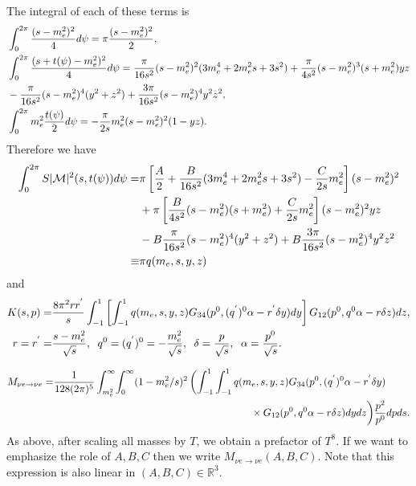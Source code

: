   The integral of each of these terms is
 \begin{align}
&\int_0^{2\pi}\frac{(s-m_e^2)^2}{4} d\psi=\pi\frac{(s-m_e^2)^2}{2},\\
&\int_0^{2\pi}\frac{(s+t(\psi)-m_e^2)^2}{4}d\psi=\frac{\pi}{16s^2}(s-m_e^2)^2(3m_e^4+2m_e^2s+3s^2)+\frac{\pi}{4s^2}(s-m_e^2)^3(s+m_e^2)yz\notag\\
&-\frac{\pi}{16s^2}(s-m_e^2)^4(y^2+z^2)+\frac{3\pi}{16s^2}(s-m_e^2)^4y^2z^2,\\
&\int_0^{2\pi} m_e^2\frac{t(\psi)}{2}d\psi=-\frac{\pi}{2s}m_e^2(s-m_e^2)^2(1-yz).
\end{align}
Therefore we have
\begin{align}
\int_0^{2\pi} S |\mathcal{M}|^2 (s,t(\psi))d\psi=&\pi\left[\frac{A}{2}+\frac{B}{16s^2}(3m_e^4+2m_e^2s+3s^2)-\frac{C}{2s}m_e^2\right](s-m_e^2)^2\notag\\
&+\pi\left[\frac{B}{4s^2}(s-m_e^2)(s+m_e^2)+\frac{C}{2s}m_e^2\right](s-m_e^2)^2yz\notag\\
&-B\frac{\pi}{16s^2}(s-m_e^2)^4(y^2+z^2)+B\frac{3\pi}{16s^2}(s-m_e^2)^4y^2z^2\notag\\
\equiv& \pi q(m_e,s,y,z)
\end{align}
and
\begin{align}\label{matrix_elem_int}
K(s,p)=&\frac{8\pi^2 rr^{'}}{s}\int_{-1}^1 \left[\int_{-1}^1 q(m_e,s,y,z) G_{34}(p^0,(q^{'})^0\alpha-r^{'}\delta y) dy\right] G_{12}(p^0,q^0\alpha-r\delta z)dz,\\
r=r^{'}=&\frac{s-m_e^2}{\sqrt{s}},\hspace{2mm} q^0=(q^{'})^0=-\frac{m_e^2}{\sqrt{s}},\hspace{2mm} \delta=\frac{p}{\sqrt{s}},\hspace{2mm}  \alpha=\frac{p^0}{\sqrt{s}}.
\end{align}

\begin{align}\label{M_simp}
M_{\nu e\rightarrow\nu e}=&\frac{1}{128(2\pi)^5 }\int_{m_e^2}^\infty\!\int_0^\infty (1-m_e^2/s)^2\left(\int_{-1}^1 \int_{-1}^1 q(m_e,s,y,z) G_{34}(p^0,(q^{'})^0\alpha-r^{'}\delta y)\right.\\
&\hspace{68mm}\times  G_{12}(p^0,q^0\alpha-r\delta z)dydz\bigg)\frac{ p^2}{p^0}dpds.\notag
\end{align}
As above, after scaling all masses by $T$, we obtain a prefactor of $T^8$. If we want to emphasize the role of $A,B,C$ then we write $M_{\nu e\rightarrow\nu e}(A,B,C)$.  Note that this expression is also linear in $(A,B,C)\in\mathbb{R}^3$.



